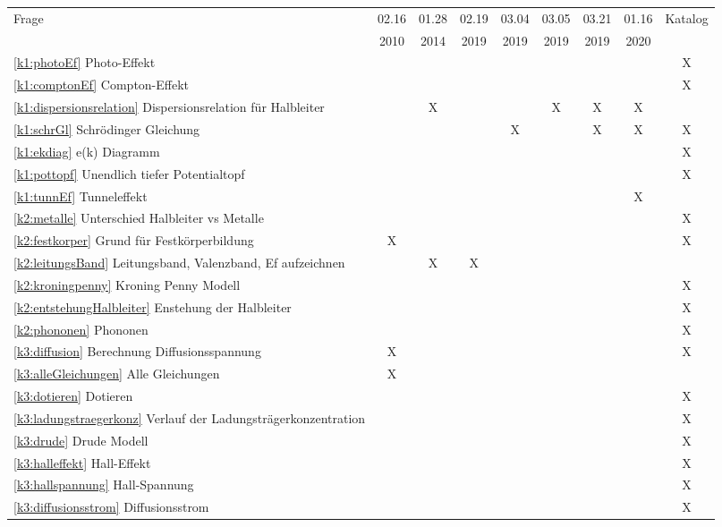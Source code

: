 \documentclass{article}
\begin{document}
\begin{center}
\begin{table}[H]
\begin{adjustbox}{width=\textwidth}
\centering
\begin{tabular}{lcccccccc}
Frage                & 02.16 & 01.28 & 02.19 & 03.04 & 03.05 & 03.21 & 01.16 & Katalog\\
                     & 2010  & 2014  & 2019  & 2019  & 2019  & 2019  & 2020 & \\
                     \hline
\ref{k1:photoEf} Photo-Effekt &&&&&&&& X \\
\ref{k1:comptonEf} Compton-Effekt &&&&&&&& X \\
\ref{k1:dispersionsrelation} Dispersionsrelation für Halbleiter && X &&& X & X & X & \\
\ref{k1:schrGl} Schrödinger Gleichung&&&& X &  & X & X & X \\
\ref{k1:ekdiag} e(k) Diagramm &&&&&&&& X \\
\ref{k1:pottopf} Unendlich tiefer Potentialtopf &&&&&&&& X \\
\ref{k1:tunnEf} Tunneleffekt&&&&&&&X & \\
\ref{k2:metalle} Unterschied Halbleiter vs Metalle &&&&&&&& X\\
\ref{k2:festkorper} Grund für Festkörperbildung & X &&&&&&& X\\
\ref{k2:leitungsBand} Leitungsband, Valenzband, Ef aufzeichnen && X & X &&&&& \\
\ref{k2:kroningpenny} Kroning Penny Modell &&&&&&&& X \\
\ref{k2:entstehungHalbleiter} Enstehung der Halbleiter &&&&&&&& X \\
\ref{k2:phononen} Phononen &&&&&&&& X \\
\ref{k3:diffusion} Berechnung Diffusionsspannung & X &&&&&&& X \\
\ref{k3:alleGleichungen} Alle Gleichungen & X &&&&&&& \\
\ref{k3:dotieren} Dotieren &&&&&&&& X \\
\ref{k3:ladungstraegerkonz} Verlauf der Ladungstr\"agerkonzentration &&&&&&&& X \\
\ref{k3:drude} Drude Modell &&&&&&&& X \\
\ref{k3:halleffekt} Hall-Effekt &&&&&&&& X \\
\ref{k3:hallspannung} Hall-Spannung &&&&&&&& X \\
\ref{k3:diffusionsstrom} Diffusionsstrom &&&&&&&& X \\

\end{tabular}
\end{adjustbox}
\end{table}
\end{center}
\end{document}
